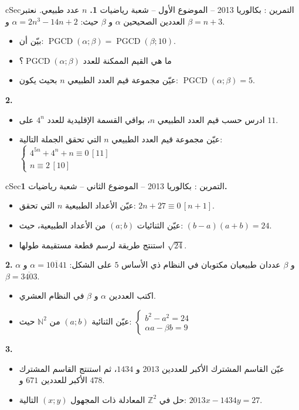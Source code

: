 \documentclass[12pt,a4paper]{article}
\newenvironment{BOX}[2]{\begin{otherlanguage}{english}\begin{arbox}{#1}{#2}}{\end{arbox}\end{otherlanguage}}
\newcounter{exo}
\newenvironment{tamrin}[1]{\stepcounter{exo}\begin{BOX}{cSec}{التمرين \theexo: #1}}{\end{BOX}}
\newcommand{\N}{\mathbb{N}}
\newcommand{\Z}{\mathbb{Z}}
\newcommand{\pgcd}{\operatorname{PGCD}}
\newenvironment{sq}{\begin{itemize}[leftmargin=2.4em,itemsep=3pt]}{\end{itemize}}
\newcommand{\qa}{\item[(أ)]}\newcommand{\qb}{\item[(ب)]}\newcommand{\qc}{\item[(جـ)]}\newcommand{\qd}{\item[(د)]}\newcommand{\qe}{\item[(هـ)]}
\begin{document}
\begin{tamrin}{بكالوريا 2013 -- الموضوع الأول -- شعبة رياضيات}
\textbf{1.} $n$ عدد طبيعي. نعتبر العددين الصحيحين $\alpha$ و $\beta$ حيث: $\alpha=2n^3-14n+2$ و $\beta=n+3$.
\begin{sq}
\qa بيّن أن: $\pgcd(\alpha;\beta)=\pgcd(\beta;10)$.
\qb ما هي القيم الممكنة للعدد $\pgcd(\alpha;\beta)$؟
\qc عيّن مجموعة قيم العدد الطبيعي $n$ بحيث يكون: $\pgcd(\alpha;\beta)=5$.
\end{sq}
\textbf{2.}
\begin{sq}
\qa ادرس حسب قيم العدد الطبيعي $n$، بواقي القسمة الإقليدية للعدد $4^n$ على $11$.
\qb عيّن مجموعة قيم العدد الطبيعي $n$ التي تحقق الجملة التالية: $\begin{cases}4^{5n}+4^n+n\equiv0\,[11]\\ n\equiv2\,[10]\end{cases}$
\end{sq}
\end{tamrin}

\begin{tamrin}{بكالوريا 2013 -- الموضوع الثاني -- شعبة رياضيات}
\textbf{1.}
\begin{sq}
\qa عيّن الأعداد الطبيعية $n$ التي تحقق: $2n+27\equiv0\,[n+1]$.
\qb عيّن الثنائيات $(a;b)$ من الأعداد الطبيعية، حيث: $(b-a)(a+b)=24$.
\qc استنتج طريقة لرسم قطعة مستقيمة طولها $\sqrt{24}$.
\end{sq}
\textbf{2.} $\alpha$ و $\beta$ عددان طبيعيان مكتوبان في النظام ذي الأساس $5$ على الشكل: $\alpha=\overline{10141}$ و $\beta=\overline{3403}$.
\begin{sq}
\qa اكتب العددين $\alpha$ و $\beta$ في النظام العشري.
\qb عيّن الثنائية $(a;b)$ من $\N^2$ حيث: $\begin{cases}b^2-a^2=24\\ \alpha a-\beta b=9\end{cases}$
\end{sq}
\textbf{3.}
\begin{sq}
\qa عيّن القاسم المشترك الأكبر للعددين $2013$ و $1434$، ثم استنتج القاسم المشترك الأكبر للعددين $671$ و $478$.
\qb حل في $\Z^2$ المعادلة ذات المجهول $(x;y)$ التالية: $2013x-1434y=27$.
\end{sq}
\end{tamrin}
\end{document}
